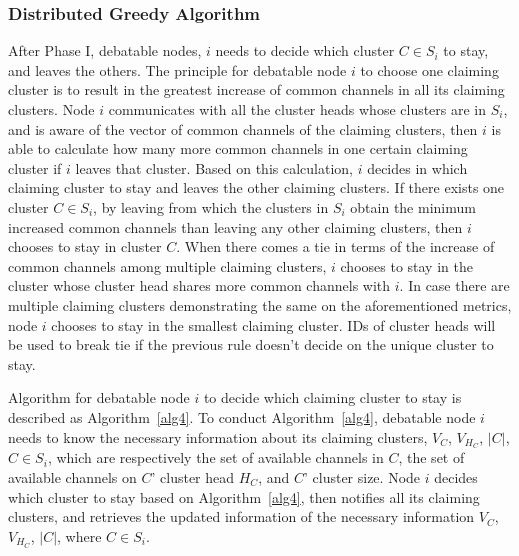 \subsubsection{Distributed Greedy Algorithm}
After Phase I, debatable nodes, \eg $i$ needs to decide which cluster $C\in S_i$ to stay, and leaves the others.
The principle for debatable node $i$ to choose one claiming cluster is to result in the greatest increase of common channels in all its claiming clusters.
Node $i$ communicates with all the cluster heads whose clusters are in $S_i$, and is aware of the vector of common channels of the claiming clusters, then $i$ is able to calculate how many more common channels in one certain claiming cluster if $i$ leaves that cluster.
Based on this calculation, $i$ decides in which claiming cluster to stay and leaves the other claiming clusters.
If there exists one cluster $C\in S_i$, by leaving from which the clusters in $S_i$ obtain the minimum increased common channels than leaving any other claiming clusters, then $i$ chooses to stay in cluster $C$.
When there comes a tie in terms of the increase of common channels among multiple claiming clusters, $i$ chooses to stay in the cluster whose cluster head shares more common channels with $i$.
In case there are multiple claiming clusters demonstrating the same on the aforementioned metrics, node $i$ chooses to stay in the smallest claiming cluster.
IDs of cluster heads will be used to break tie if the previous rule doesn't decide on the unique cluster to stay.

Algorithm for debatable node $i$ to decide which claiming cluster to stay is described as Algorithm~\ref{alg4}.
To conduct Algorithm~\ref{alg4}, debatable node $i$ needs to know the necessary information about its claiming clusters, \ie $V_C$, $V_{H_C}$, $|C|$,$C\in S_i$, which are respectively the set of available channels in $C$, the set of available channels on $C$' cluster head $H_C$, and $C$' cluster size.
Node $i$ decides which cluster to stay based on Algorithm~\ref{alg4}, then notifies all its claiming clusters, and retrieves the updated information of the necessary information $V_C$, $V_{H_C}$, $|C|$, where $C\in S_i$.

